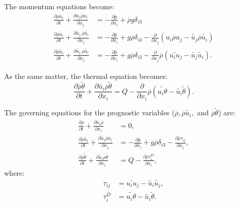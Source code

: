The momentum equations become:
\begin{align}
  \frac{\partial \overline{\rho u_i}}{\partial t} + \frac{\partial \overline{u_j\rho u_i}}{\partial x_j} &= -\frac{\partial \overline{p}}{\partial x_i} + \overline{\rho} g\delta_{i3} \\
  \frac{\partial \overline{\rho}\widetilde{u_i}}{\partial t} + \frac{\partial \widetilde{u_j}\:\overline{\rho}\widetilde{u_i}}{\partial x_j} &= -\frac{\partial \overline{p}}{\partial x_i} + g\overline{\rho} \delta_{i3}
    -\frac{\partial}{\partial x_j}\left(\overline{u_i \rho u_j} - \widetilde{u_j}\overline{\rho}\widetilde{u_i}\right) \\
  \frac{\partial \overline{\rho}\widetilde{u_i}}{\partial t} + \frac{\partial \widetilde{u_j}\:\overline{\rho}\widetilde{u_i}}{\partial x_j} &= -\frac{\partial \overline{p}}{\partial x_i} + g\overline{\rho} \delta_{i3}
    -\frac{\partial}{\partial x_j}\overline{\rho}\left(\widetilde{u_i u_j} - \widetilde{u_j}\widetilde{u_i}\right).
\end{align}


As the same matter, the thermal equation becomes:
\begin{equation}
  \frac{\partial \overline{\rho}\widetilde{\theta}}{\partial t}
  + \frac{\partial \widetilde{u_i}\overline{\rho}\widetilde{\theta}}{\partial x_i}
  = Q -\frac{\partial}{\partial x_i}\overline{\rho}\left(\widetilde{u_i\theta}-\widetilde{u_i}\widetilde{\theta}\right).
\end{equation}

The governing equations for the prognostic variables 
($\overline{\rho}, \overline{\rho}\widetilde{u_i}, $ and $\overline{\rho}\widetilde{\theta}$) are:
\begin{align}
  \frac{\partial \overline{\rho}}{\partial t}
  + \frac{\partial \widetilde{u_i}\overline{\rho}}{\partial x_i} &= 0, \\
  \frac{\partial \overline{\rho}\widetilde{u_i}}{\partial t}
  + \frac{\partial \widetilde{u_j}\overline{\rho}\widetilde{u_i}}{\partial x_j}
  &= -\frac{\partial \overline{p}}{\partial x_i} + g\overline{\rho}\delta_{i3}
  -\frac{\partial \overline{\rho}\tau_{ij}}{\partial x_j}, \\
  \frac{\partial \overline{\rho}\widetilde{\theta}}{\partial t}
  + \frac{\partial \widetilde{u_i}\overline{\rho}\widetilde{\theta}}{\partial x_i}
  &= Q -\frac{\partial \overline{\rho}\tau^D_{i}}{\partial x_i},
\end{align}
where:
\begin{align}
  \tau_{ij} &= \widetilde{u_iu_j}-\widetilde{u_i}\widetilde{u_j}, \\
  \tau^D_{i} &= \widetilde{u_i\theta}-\widetilde{u_i}\widetilde{\theta}.
\end{align}


